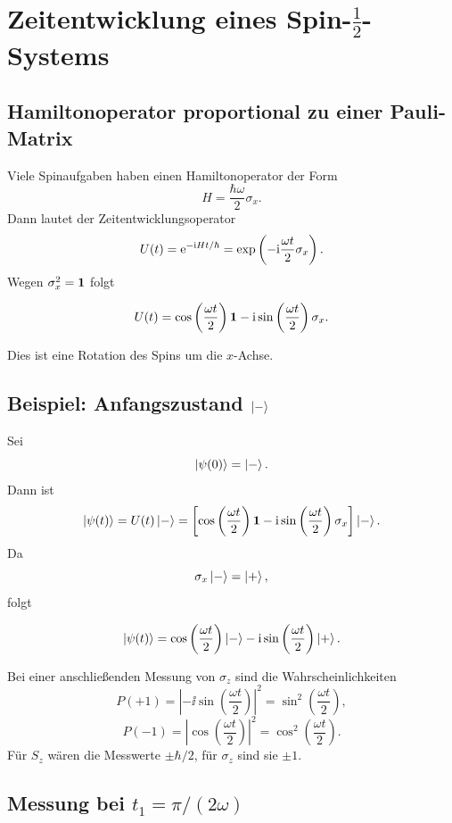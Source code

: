 \section{Zeitentwicklung eines Spin-\texorpdfstring{\(\frac12\)}{1/2}-Systems}

\subsection{Hamiltonoperator proportional zu einer Pauli-Matrix}

Viele Spinaufgaben haben einen Hamiltonoperator der Form
\[
    H=\frac{\hbar\omega}{2}\sigma_x.
\]
Dann lautet der Zeitentwicklungsoperator
\[
    U(t)=\mathrm{e}^{-\mathrm{i} Ht/\hbar}
    =\exp\left(-\mathrm{i}\frac{\omega t}{2}\sigma_x\right).
\]
Wegen \(\sigma_x^2=\mathbf{1}\) folgt
\begin{formulabox}
\[
    U(t)=\cos\left(\frac{\omega t}{2}\right)\mathbf{1}
    -\mathrm{i}\sin\left(\frac{\omega t}{2}\right)\sigma_x.
\]
\end{formulabox}

Dies ist eine Rotation des Spins um die \(x\)-Achse.

\subsection{Beispiel: Anfangszustand \(\left|-\right\rangle\)}

Sei
\[
    \left|\psi(0)\right\rangle=\left|-\right\rangle.
\]
Dann ist
\[
    \left|\psi(t)\right\rangle=U(t)\left|-\right\rangle
    =\left[\cos\left(\frac{\omega t}{2}\right)\mathbf{1}
    -\mathrm{i}\sin\left(\frac{\omega t}{2}\right)\sigma_x\right]\left|-\right\rangle.
\]
Da
\[
    \sigma_x\left|-\right\rangle=\left|+\right\rangle,
\]
folgt
\begin{formulabox}
\[
    \left|\psi(t)\right\rangle
    =\cos\left(\frac{\omega t}{2}\right)\left|-\right\rangle
    -\mathrm{i}\sin\left(\frac{\omega t}{2}\right)\left|+\right\rangle.
\]
\end{formulabox}

Bei einer anschließenden Messung von \(\sigma_z\) sind die Wahrscheinlichkeiten
\[
    P(+1)=\left|-\ii\sin\left(\frac{\omega t}{2}\right)\right|^2
    =\sin^2\left(\frac{\omega t}{2}\right),
\]
\[
    P(-1)=\left|\cos\left(\frac{\omega t}{2}\right)\right|^2
    =\cos^2\left(\frac{\omega t}{2}\right).
\]
Für \(S_z\) wären die Messwerte \(\pm\hbar/2\), für \(\sigma_z\) sind sie \(\pm1\).

\subsection{Messung bei \(t_1=\pi/(2\omega)\)}

